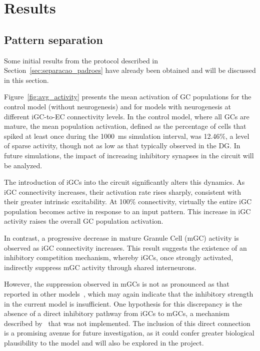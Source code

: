 \chapter{Results}

\section{Pattern separation}


Some initial results from the protocol described in Section~\ref{sec:separacao_padroes} have already been obtained and will be
discussed in this section.

Figure~\ref{fig:avg_activity} presents the mean activation of GC populations for the control model (without neurogenesis) and
for models with neurogenesis at different iGC-to-EC connectivity levels. In the control model, where all GCs are mature, the
mean population activation, defined as the percentage of cells that spiked at least once during the \SI{1000}{\milli\second}
simulation interval, was 12.46\%, a level of sparse activity, though not as low as that typically observed in the DG. In
future simulations, the impact of increasing inhibitory synapses in the circuit will be analyzed.

The introduction of iGCs into the circuit significantly alters this dynamics. As iGC connectivity increases, their activation
rate rises sharply, consistent with their greater intrinsic excitability. At 100\% connectivity, virtually the entire iGC
population becomes active in response to an input pattern. This increase in iGC activity raises the overall GC population
activation.

In contrast, a progressive decrease in mature Granule Cell (mGC) activity is observed as iGC connectivity increases. This
result suggests the existence of an inhibitory competition mechanism, whereby iGCs, once strongly activated, indirectly suppress
mGC activity through shared interneurons.

However, the suppression observed in mGCs is not as pronounced as that reported in other models~\parencite{kimEffect2024}, which may
again indicate that the inhibitory strength in the current model is insufficient. One hypothesis for this discrepancy is the
absence of a direct inhibitory pathway from iGCs to mGCs, a mechanism described by~\textcite{lunaAdultborn2019} that was not
implemented. The inclusion of this direct connection is a promising avenue for future investigation, as it could confer greater
biological plausibility to the model and will also be explored in the project.

